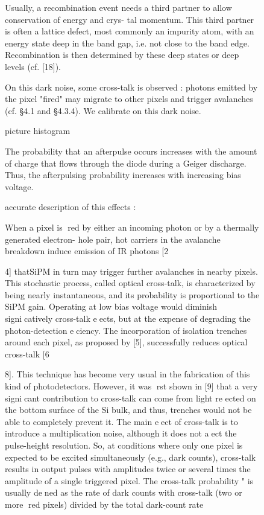 \begin{figure}[!hbtp]
  Usually, a recombination event needs a third partner to allow conservation of energy and crys-
  tal momentum. This third partner is often a lattice defect, most commonly an impurity atom,
  with an energy state deep in the band gap, i.e. not close to the band edge. Recombination is
  then determined by these deep states or deep levels (cf. [18]).


On this dark noise, some cross-talk is observed :
photons emitted by the pixel "fired" may migrate to other pixels and trigger avalanches (cf. §4.1
and §4.3.4). We calibrate on this dark noise.

picture histogram


  
  The probability that an afterpulse occurs increases with the amount of charge that flows through the diode during a Geiger
  discharge. Thus, the afterpulsing probability increases with increasing bias voltage.
  
 
  accurate  description  of  this effects :
  
    When a pixel is red by either an incoming photon or by a thermally generated electron-
  hole pair, hot carriers in the avalanche breakdown induce emission of IR photons [2{4] thatSiPM
  in turn may trigger further avalanches in nearby pixels.  This stochastic process,  called
  optical  cross-talk,  is  characterized  by  being  nearly  instantaneous,  and  its  probability  is
  proportional to the SiPM gain. Operating at low bias voltage would diminish signicatively
  cross-talk  eects,  but  at  the  expense  of  degrading  the  photon-detection  eciency.   The
  incorporation  of  isolation  trenches  around  each  pixel,  as  proposed  by  [5],  successfully
  reduces optical cross-talk [6{8].  This technique has become very usual in the fabrication
  of this kind of photodetectors.  However, it was rst shown in [9] that a very signicant
  contribution to cross-talk can come from light re
  ected on the bottom surface of the Si
  bulk, and thus, trenches would not be able to completely prevent it.
  The  main  eect  of  cross-talk  is  to  introduce  a  multiplication  noise,  although  it  does
  not aect the pulse-height resolution.  So, at conditions where only one pixel is expected
  to be excited simultaneously (e.g.,  dark counts),  cross-talk results in output pulses with
  amplitudes twice or several times the amplitude of a single triggered pixel.  The cross-talk
  probability
  "
  is usually dened as the rate of dark counts with cross-talk (two or more red
  pixels) divided by the total dark-count rate

}}
\end{figure}

